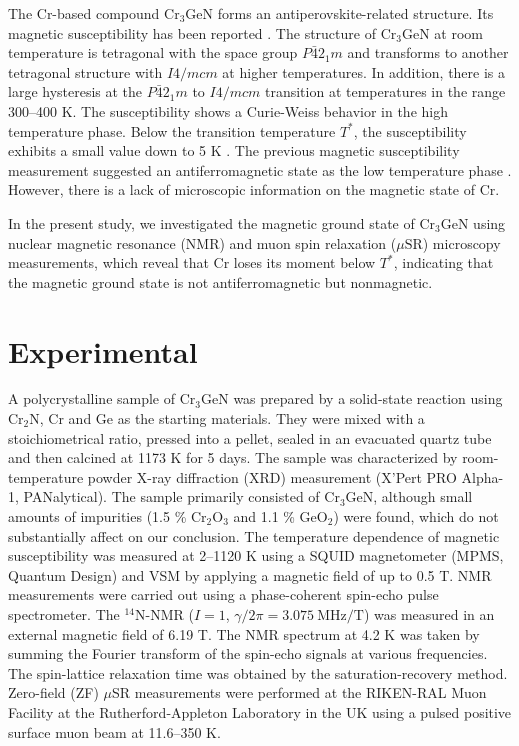 \documentclass[a4paper]{jpconf}
\newcommand{\CGN}{\mathrm{Cr_3GeN}}
\newcommand{\muSR}{\mu \mathrm{SR}}
\newcommand{\Nitnuc}{^{14}\mathrm{N}}
\begin{document}
The Cr-based compound $\CGN$ forms an antiperovskite-related structure. 
Its magnetic susceptibility has been reported  \cite{Nardin1, Lin}.
The structure of $\CGN$ at room temperature is tetragonal with the space group $P\bar{4}2_1m$ \cite{Boller1}
and transforms to another tetragonal structure with $I4/mcm$ at higher temperatures. 
In addition, there is a large hysteresis at the $P\bar{4}2_1m$ to $I4/mcm$ transition at temperatures in the range 300--400 K.
The susceptibility shows a Curie-Weiss behavior in the high temperature phase. Below the transition temperature $T^*$, the susceptibility exhibits a small value down to 5 K \cite{Lin}.
The previous magnetic susceptibility measurement suggested an antiferromagnetic state as the low temperature phase \cite{Lin}. However, there is a lack of microscopic information on the magnetic state of Cr. 

In the present study, we investigated the magnetic ground state of $\CGN$ using nuclear magnetic resonance (NMR) and  muon spin relaxation ($\muSR$) microscopy measurements, 
which reveal that Cr loses its moment below $T^*$, indicating that the magnetic ground state is not antiferromagnetic but nonmagnetic.

\section{Experimental}
A polycrystalline sample of $\CGN$ was prepared by a solid-state reaction using %
Cr$_2$N, Cr and Ge as the starting materials.
They were mixed with a stoichiometrical ratio, pressed into a pellet, sealed in an evacuated quartz tube and then calcined at 1173 K for 5 days.
The sample was characterized by room-temperature powder X-ray diffraction (XRD) measurement (X'Pert PRO Alpha-1, PANalytical). The sample primarily consisted of $\CGN$, although small amounts of impurities (1.5 \%  Cr$_2$O$_3$ and 1.1 \% GeO$_2$) were found, which do not substantially affect on our conclusion. 
The temperature dependence of magnetic susceptibility was measured at 2--1120 K using a SQUID magnetometer (MPMS, Quantum Design) and VSM by applying a magnetic field of up to 0.5 T.
NMR measurements were carried out using a phase-coherent spin-echo pulse spectrometer.
The $\Nitnuc$-NMR ($I = 1$, $\gamma /2 \pi = 3.075 \ \mathrm{MHz/ T}$) was measured in an external magnetic field of 6.19 T.
The NMR spectrum at 4.2 K was taken by summing the Fourier transform of the spin-echo signals at various frequencies.
The spin-lattice relaxation time was obtained by the saturation-recovery method.
Zero-field (ZF) $\mu$SR measurements were performed at the RIKEN-RAL Muon Facility at the Rutherford-Appleton Laboratory in the UK using a pulsed positive surface muon beam at 11.6--350 K.
 
\end{document}
